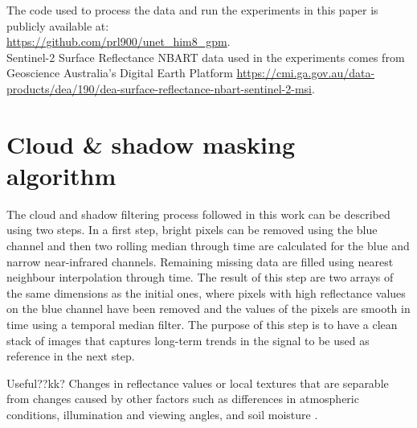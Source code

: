 \documentclass[essd, manuscript]{copernicus}
\begin{document}




\codedataavailability{} 
The code used to process the data and run the experiments in this paper is publicly available at: \\
\href{https://github.com/prl900/unet_him8_gpm}{https://github.com/prl900/unet\_him8\_gpm}. \\
Sentinel-2 Surface Reflectance NBART data used in the experiments comes from Geoscience Australia's Digital Earth Platform \href{https://cmi.ga.gov.au/data-products/dea/190/dea-surface-reflectance-nbart-sentinel-2-msi}{https://cmi.ga.gov.au/data-products/dea/190/dea-surface-reflectance-nbart-sentinel-2-msi}. 



\appendix
\section{Cloud \& shadow masking algorithm} %

The cloud and shadow filtering process followed in this work can be described using two steps. In a first step, bright pixels can be removed using the blue channel and then two rolling median through time are calculated for the blue and narrow near-infrared channels. Remaining missing data are filled using nearest neighbour interpolation through time. The result of this step are two arrays of the same dimensions as the initial ones, where pixels with high reflectance values on the blue channel have been removed and the values of the pixels are smooth in time using a temporal median filter. The purpose of this step is to have a clean stack of images that captures long-term trends in the signal to be used as reference in the next step.

Useful??kk? Changes in reflectance values or local textures that are separable from changes caused by other factors such as differences in atmospheric conditions, illumination and viewing angles, and soil moisture \citep{deng2008pca}.
\end{document}
